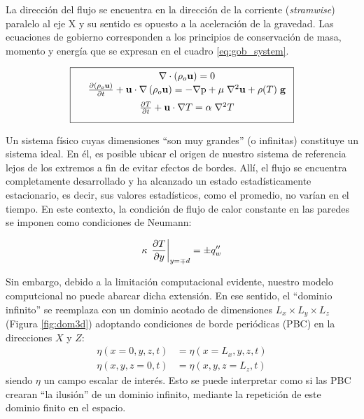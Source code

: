La dirección del flujo se encuentra en la dirección de la corriente (\textit{stramwise}) paralelo al eje X y su sentido es opuesto a la aceleración de la gravedad. Las ecuaciones de gobierno corresponden a los principios de conservación de masa, momento y energía que se expresan en el cuadro \ref{eq:gob_system}.

\begin{equation}
        \boxed{ \begin{array}{lcc}
              &  \nabla \cdot \left( \rho_o \mathbf{u} \right) = 0 \\
              \vspace*{2mm}
              &  \frac{\partial \left( \rho_o \mathbf{u} \right)}{\partial t} + \mathbf{u} \cdot \nabla  \left( \rho_o \mathbf{u} \right) = -\nabla \text{p} + \mu \hspace{1mm} {\nabla}^2 \mathbf{u}  + \rho(T) \hspace{1mm} \mathbf{g} \\
              \vspace*{2mm}
              &  \frac{\partial T}{\partial t} + \mathbf{u} \cdot \nabla T =  \alpha \hspace{1mm} \nabla^2 T  \\
             \end{array}
               }
             \label{eq:gob_system}
\end{equation}

Un sistema físico cuyas dimensiones ``son muy grandes'' (o infinitas) constituye un sistema ideal. En él, es posible ubicar el origen de nuestro sistema de referencia lejos de los extremos a fin de evitar efectos de bordes. Allí, el flujo se encuentra completamente desarrollado y ha alcanzado un estado estadísticamente estacionario, es decir, sus valores estadísticos, como el promedio, no varían en el tiempo. En este contexto, la condición de flujo de calor constante en las paredes se imponen como condiciones de Neumann:

\begin{equation}
\kappa \hspace{0.5mm} \left. \frac{\partial T}{\partial y} \right\vert_{y=\mp d} = \pm q''_w
\label{eq:neumann}
\end{equation}

Sin embargo, debido a la limitación computacional evidente, nuestro modelo computcional no puede abarcar dicha extensión. En ese sentido, el ``dominio infinito'' se reemplaza con un dominio acotado de dimensiones $L_x \times L_y \times L_z$ (Figura \ref{fig:dom3d}) adoptando condiciones de borde periódicas (PBC) en la direcciones $X$ y $Z$:
\begin{align}
\eta(x=0,y,z,t) &= \eta(x=L_x,y,z,t) \\ 
\eta(x,y,z=0,t) &= \eta(x,y,z=L_z,t)
\end{align}
siendo $\eta$ un campo escalar de interés. Esto se puede interpretar como si las PBC crearan ``la ilusión'' de un dominio infinito, mediante la repetición de este dominio finito en el espacio.

